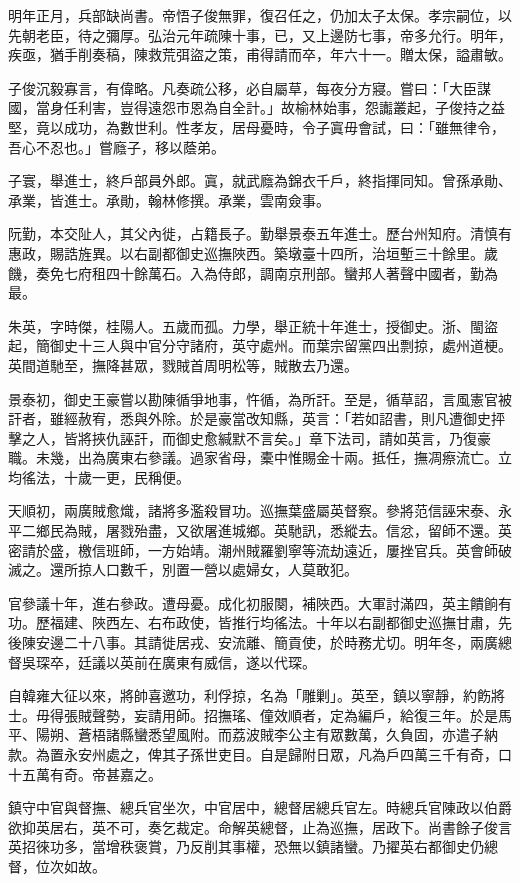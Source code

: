 \begin{pinyinscope}
明年正月，兵部缺尚書。帝悟子俊無罪，復召任之，仍加太子太保。孝宗嗣位，以先朝老臣，待之彌厚。弘治元年疏陳十事，已，又上邊防七事，帝多允行。明年，疾亟，猶手削奏稿，陳救荒弭盜之策，甫得請而卒，年六十一。贈太保，謚肅敏。

子俊沉毅寡言，有偉略。凡奏疏公移，必自屬草，每夜分方寢。嘗曰：「大臣謀國，當身任利害，豈得遠怨市恩為自全計。」故榆林始事，怨讟叢起，子俊持之益堅，竟以成功，為數世利。性孝友，居母憂時，令子寘毋會試，曰：「雖無律令，吾心不忍也。」嘗廕子，移以蔭弟。

子寰，舉進士，終戶部員外郎。寘，就武廕為錦衣千戶，終指揮同知。曾孫承勛、承業，皆進士。承勛，翰林修撰。承業，雲南僉事。

阮勤，本交阯人，其父內徙，占籍長子。勤舉景泰五年進士。歷台州知府。清慎有惠政，賜誥旌異。以右副都御史巡撫陜西。築墩臺十四所，治垣塹三十餘里。歲饑，奏免七府租四十餘萬石。入為侍郎，調南京刑部。蠻邦人著聲中國者，勤為最。

朱英，字時傑，桂陽人。五歲而孤。力學，舉正統十年進士，授御史。浙、閩盜起，簡御史十三人與中官分守諸府，英守處州。而葉宗留黨四出剽掠，處州道梗。英間道馳至，撫降甚眾，戮賊首周明松等，賊散去乃還。

景泰初，御史王豪嘗以勘陳循爭地事，忤循，為所訐。至是，循草詔，言風憲官被訐者，雖經赦宥，悉與外除。於是豪當改知縣，英言：「若如詔書，則凡遭御史抨擊之人，皆將挾仇誣訐，而御史愈緘默不言矣。」章下法司，請如英言，乃復豪職。未幾，出為廣東右參議。過家省母，橐中惟賜金十兩。抵任，撫凋瘵流亡。立均徭法，十歲一更，民稱便。

天順初，兩廣賊愈熾，諸將多濫殺冒功。巡撫葉盛屬英督察。參將范信誣宋泰、永平二鄉民為賊，屠戮殆盡，又欲屠進城鄉。英馳訊，悉縱去。信忿，留師不還。英密請於盛，檄信班師，一方始靖。潮州賊羅劉寧等流劫遠近，屢挫官兵。英會師破滅之。還所掠人口數千，別置一營以處婦女，人莫敢犯。

官參議十年，進右參政。遭母憂。成化初服闋，補陜西。大軍討滿四，英主饋餉有功。歷福建、陜西左、右布政使，皆推行均徭法。十年以右副都御史巡撫甘肅，先後陳安邊二十八事。其請徙居戎、安流離、簡貢使，於時務尤切。明年冬，兩廣總督吳琛卒，廷議以英前在廣東有威信，遂以代琛。

自韓雍大征以來，將帥喜邀功，利俘掠，名為「雕剿」。英至，鎮以寧靜，約飭將士。毋得張賊聲勢，妄請用師。招撫瑤、僮效順者，定為編戶，給復三年。於是馬平、陽朔、蒼梧諸縣蠻悉望風附。而荔波賊李公主有眾數萬，久負固，亦遣子納款。為置永安州處之，俾其子孫世吏目。自是歸附日眾，凡為戶四萬三千有奇，口十五萬有奇。帝甚嘉之。

鎮守中官與督撫、總兵官坐次，中官居中，總督居總兵官左。時總兵官陳政以伯爵欲抑英居右，英不可，奏乞裁定。命解英總督，止為巡撫，居政下。尚書餘子俊言英招徠功多，當增秩褒賞，乃反削其事權，恐無以鎮諸蠻。乃擢英右都御史仍總督，位次如故。


\end{pinyinscope}
